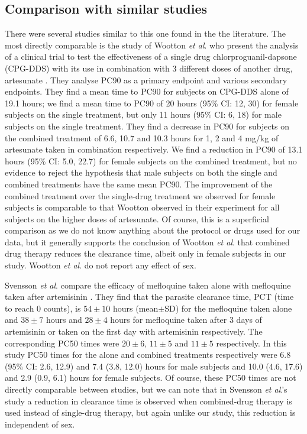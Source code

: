 \subsection{Comparison with similar studies}
There were several studies similar to this one found in the the literature. The most directly comparable is the study of Wootton {\it et al}. who present the analysis of a clinical trial to test the effectiveness of a single drug chlorproguanil-dapsone (CPG-DDS) with its use in combination with 3 different doses of another drug, artesunate \cite{wootton}. They analyse PC90 as a primary endpoint and various secondary endpoints. They find a mean time to PC90 for subjects on CPG-DDS alone of 19.1 hours; we find a mean time to PC90 of 20 hours (95\% CI: 12, 30) for female subjects on the single treatment, but only 11 hours (95\% CI: 6, 18) for male subjects on the single treatment. They find a decrease in PC90 for subjects on the combined treatment of 6.6, 10.7 and 10.3 hours for 1, 2 and 4 mg/kg of artesunate taken in combination respectively. We find a reduction in PC90 of 13.1 hours (95\% CI: 5.0, 22.7) for female subjects on the combined treatment, but no evidence to reject the hypothesis that male subjects on both the single and combined treatments have the same mean PC90. The improvement of the combined treatment over the single-drug treatment we observed for female subjects is comparable to that Wootton observed in their experiment for all subjects on the higher doses of artesunate. Of course, this is a superficial comparison as we do not know anything about the protocol or drugs used for our data, but it generally supports the conclusion of Wootton {\it et al}. that combined drug therapy reduces the clearance time, albeit only in female subjects in our study. Wootton {\it et al}. do not report any effect of sex.

Svensson {\it et al}. compare the efficacy of mefloquine taken alone with mefloquine taken after artemisinin \cite{svensson}. They find that the parasite clearance time, PCT (time to reach 0 counts), is $54\pm10$ hours (mean$\pm$SD) for the mefloquine taken alone and $38\pm7$ hours and $28\pm4$ hours for mefloquine taken after 3 days of artemisinin or taken on the first day with artemisinin respectively. The corresponding PC50 times were $20\pm6$, $11\pm5$ and $11\pm5$ respectively. In this study PC50 times for the alone and combined treatments respectively were 6.8 (95\% CI: 2.6, 12.9) and 7.4 (3.8, 12.0) hours for male subjects and 10.0 (4.6, 17.6) and 2.9 (0.9, 6.1) hours for female subjects. Of course, these PC50 times are not directly comparable between studies, but we can note that in Svensson {\it et al}.'s study a reduction in clearance time is observed when combined-drug therapy is used instead of single-drug therapy, but again unlike our study, this reduction is independent of sex.

